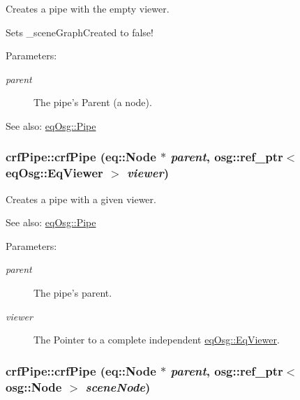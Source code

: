 Creates a pipe with the empty viewer. 

Sets \_\-sceneGraphCreated to false! \begin{Desc}
\item[Parameters:]
\begin{description}
\item[{\em parent}]The pipe's Parent (a node). \end{description}
\end{Desc}
\begin{Desc}
\item[See also:]\hyperlink{a00014}{eqOsg::Pipe} \end{Desc}
\hypertarget{a00006_f5c46c7219b170979654b9e0defda4a7}{
\subsubsection[{crfPipe}]{\setlength{\rightskip}{0pt plus 5cm}crfPipe::crfPipe (eq::Node $\ast$ {\em parent}, \/  osg::ref\_\-ptr$<$ {\bf eqOsg::EqViewer} $>$ {\em viewer})}}
\label{a00006_f5c46c7219b170979654b9e0defda4a7}


Creates a pipe with a given viewer. 

\begin{Desc}
\item[See also:]\hyperlink{a00014}{eqOsg::Pipe} \end{Desc}
\begin{Desc}
\item[Parameters:]
\begin{description}
\item[{\em parent}]The pipe's parent. \item[{\em viewer}]The Pointer to a complete independent \hyperlink{a00009}{eqOsg::EqViewer}. \end{description}
\end{Desc}
\hypertarget{a00006_d1215b24804515699867f0e718eb6985}{
\subsubsection[{crfPipe}]{\setlength{\rightskip}{0pt plus 5cm}crfPipe::crfPipe (eq::Node $\ast$ {\em parent}, \/  osg::ref\_\-ptr$<$ osg::Node $>$ {\em sceneNode})}}
\label{a00006_d1215b24804515699867f0e718eb6985}


